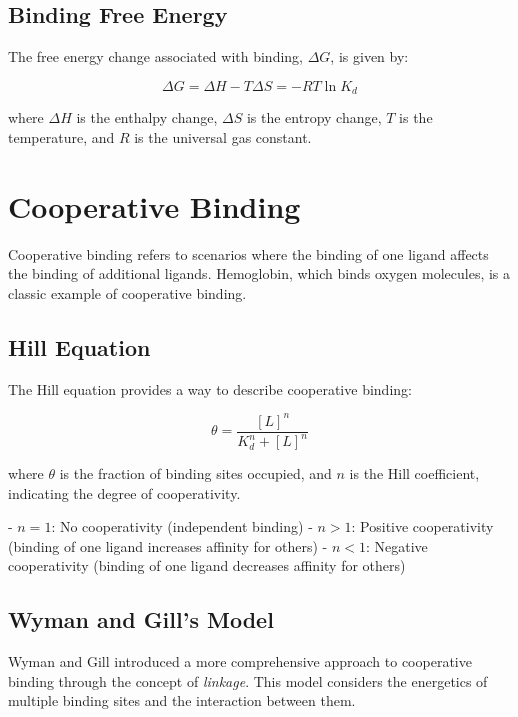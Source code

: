 \documentclass[english,course]{lecture}
\begin{document}
\subsection{Binding Free Energy}

The free energy change associated with binding, \(\Delta G\), is given by:

\[
\Delta G = \Delta H - T \Delta S = -RT \ln K_d
\]

where \(\Delta H\) is the enthalpy change, \(\Delta S\) is the entropy change, \(T\) is the temperature, and \(R\) is the universal gas constant.

\vfill
\eject


\section{Cooperative Binding}

Cooperative binding refers to scenarios where the binding of one ligand affects the binding of additional ligands. Hemoglobin, which binds oxygen molecules, is a classic example of cooperative binding.

\subsection{Hill Equation}

The Hill equation provides a way to describe cooperative binding:

\[
\theta = \frac{[L]^n}{K_d^n + [L]^n}
\]

where \(\theta\) is the fraction of binding sites occupied, and \(n\) is the Hill coefficient, indicating the degree of cooperativity.

- \(n = 1\): No cooperativity (independent binding)
- \(n > 1\): Positive cooperativity (binding of one ligand increases affinity for others)
- \(n < 1\): Negative cooperativity (binding of one ligand decreases affinity for others)

\subsection{Wyman and Gill's Model}

Wyman and Gill introduced a more comprehensive approach to cooperative binding through the concept of \emph{linkage}. This model considers the energetics of multiple binding sites and the interaction between them.
\end{document}
